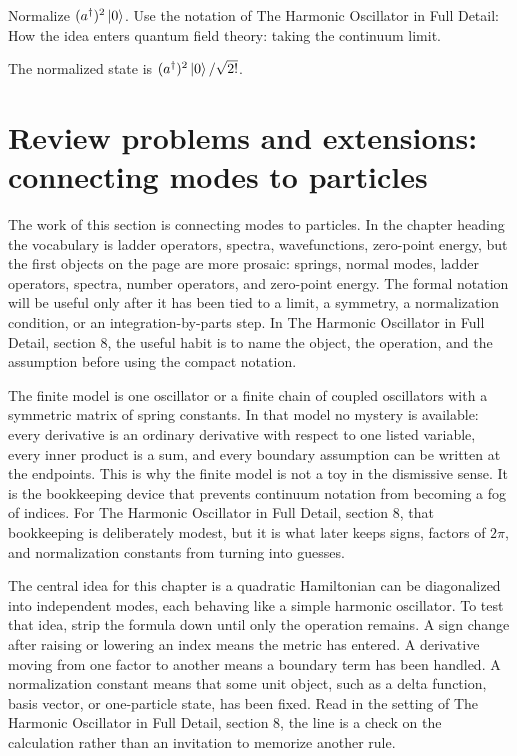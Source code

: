 \begin{exercise}
Normalize \((a^\dagger)^2\left|0\right\rangle\).  Use the notation of The Harmonic Oscillator in Full Detail: How the idea enters quantum field theory: taking the continuum limit.
\begin{answer}
The normalized state is \((a^\dagger)^2\left|0\right\rangle/\sqrt{2!}\).
\end{answer}
\end{exercise}



\section{Review problems and extensions: connecting modes to particles}

The work of this section is connecting modes to particles.  In the chapter heading the vocabulary is ladder operators, spectra, wavefunctions, zero-point energy, but the first objects on the page are more prosaic: springs, normal modes, ladder operators, spectra, number operators, and zero-point energy.  The formal notation will be useful only after it has been tied to a limit, a symmetry, a normalization condition, or an integration-by-parts step.  In The Harmonic Oscillator in Full Detail, section 8, the useful habit is to name the object, the operation, and the assumption before using the compact notation.

The finite model is one oscillator or a finite chain of coupled oscillators with a symmetric matrix of spring constants.  In that model no mystery is available: every derivative is an ordinary derivative with respect to one listed variable, every inner product is a sum, and every boundary assumption can be written at the endpoints.  This is why the finite model is not a toy in the dismissive sense.  It is the bookkeeping device that prevents continuum notation from becoming a fog of indices.  For The Harmonic Oscillator in Full Detail, section 8, that bookkeeping is deliberately modest, but it is what later keeps signs, factors of \(2\pi\), and normalization constants from turning into guesses.

The central idea for this chapter is a quadratic Hamiltonian can be diagonalized into independent modes, each behaving like a simple harmonic oscillator.  To test that idea, strip the formula down until only the operation remains.  A sign change after raising or lowering an index means the metric has entered.  A derivative moving from one factor to another means a boundary term has been handled.  A normalization constant means that some unit object, such as a delta function, basis vector, or one-particle state, has been fixed.  Read in the setting of The Harmonic Oscillator in Full Detail, section 8, the line is a check on the calculation rather than an invitation to memorize another rule.

